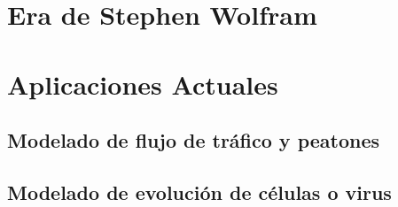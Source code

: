 \section{Era de Stephen Wolfram} %


\section{Aplicaciones Actuales} %

\subsection{Modelado de flujo de tráfico y peatones}

\subsection{Modelado de evolución de células o virus}







